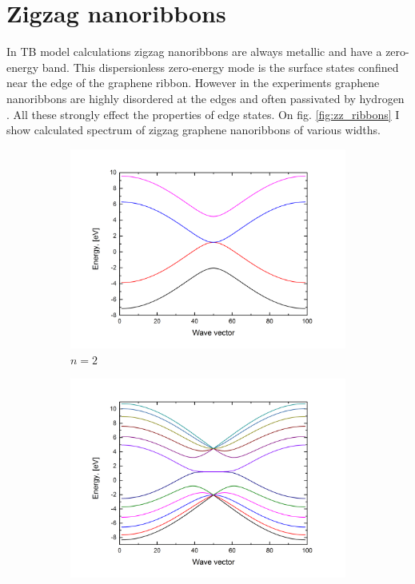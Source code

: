 \section{Zigzag nanoribbons}
In TB model calculations zigzag nanoribbons are always metallic and have a zero-energy band. This dispersionless zero-energy mode is the surface states confined near the edge of the graphene ribbon. However in the experiments graphene nanoribbons are highly disordered at the edges \cite{areshkin} and often passivated by hydrogen \cite{barone}. All these strongly effect the properties of edge states. On fig. \ref{fig:zz_ribbons} I show calculated spectrum of zigzag graphene nanoribbons of various widths.
\begin{figure}[hb!]
\centering
\begin{subfigure}{.5\textwidth}
  \centering
  \includegraphics[width=\linewidth]{img/zz_ribbon_2}
  \caption{$n=2$}
  \label{fig:zz2}
\end{subfigure}%
\begin{subfigure}{.5\textwidth}
  \centering
  \includegraphics[width=\linewidth]{img/zz_ribbon_6}

\end{subfigure}
\end{figure}
